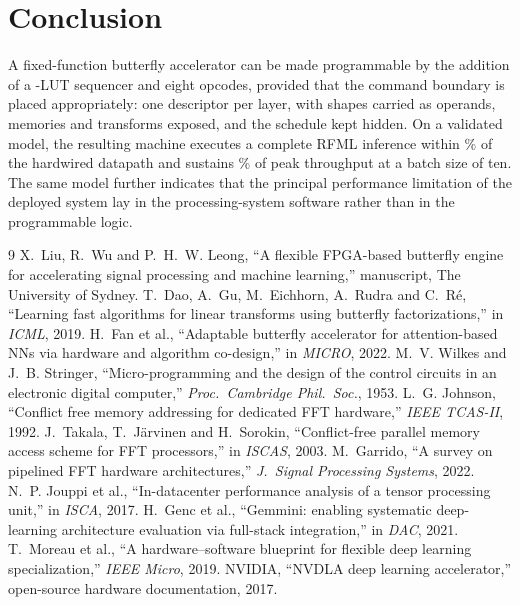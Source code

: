 \documentclass[twocolumn,10pt]{article}
\begin{document}
\section{Conclusion}
A fixed-function butterfly accelerator can be made programmable by the addition
of a \SeqLut-LUT sequencer and eight opcodes, provided that the command boundary
is placed appropriately: one descriptor per layer, with shapes carried as
operands, memories and transforms exposed, and the schedule kept hidden.  On a
validated model, the resulting machine executes a complete RFML inference within
\TunedOvh\% of the hardwired datapath and sustains \TunedBatchTenPct\% of peak
throughput at a batch size of ten.  The same model further indicates that the
principal performance limitation of the deployed system lay in the
processing-system software rather than in the programmable logic.

\begin{thebibliography}{9}\footnotesize
{} X.~Liu, R.~Wu and P.~H.~W. Leong, ``A flexible FPGA-based
butterfly engine for accelerating signal processing and machine learning,''
manuscript, The University of Sydney.
 T.~Dao, A.~Gu, M.~Eichhorn, A.~Rudra and C.~R\'e,
``Learning fast algorithms for linear transforms using butterfly
factorizations,'' in \emph{ICML}, 2019.
 H.~Fan et al., ``Adaptable butterfly accelerator for
attention-based NNs via hardware and algorithm co-design,'' in \emph{MICRO},
2022.
 M.~V. Wilkes and J.~B. Stringer, ``Micro-programming and
the design of the control circuits in an electronic digital computer,''
\emph{Proc.\ Cambridge Phil.\ Soc.}, 1953.
 L.~G. Johnson, ``Conflict free memory addressing for
dedicated FFT hardware,'' \emph{IEEE TCAS-II}, 1992.
 J.~Takala, T.~J\"arvinen and H.~Sorokin, ``Conflict-free
parallel memory access scheme for FFT processors,'' in \emph{ISCAS}, 2003.
 M.~Garrido, ``A survey on pipelined FFT hardware
architectures,'' \emph{J.\ Signal Processing Systems}, 2022.
 N.~P. Jouppi et al., ``In-datacenter performance analysis of a
tensor processing unit,'' in \emph{ISCA}, 2017.
 H.~Genc et al., ``Gemmini: enabling systematic deep-learning
architecture evaluation via full-stack integration,'' in \emph{DAC}, 2021.
 T.~Moreau et al., ``A hardware--software blueprint for flexible
deep learning specialization,'' \emph{IEEE Micro}, 2019.
 NVIDIA, ``NVDLA deep learning accelerator,'' open-source
hardware documentation, 2017.
\end{thebibliography}
\end{document}
